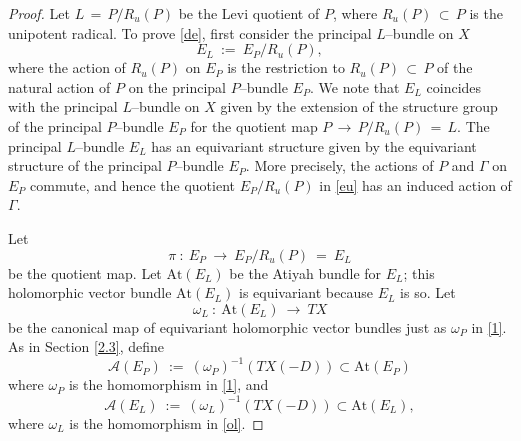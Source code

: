 \documentclass[12pt, reqno]{amsart}
\numberwithin{equation}{section}
\newcommand{\At}{\textrm{At}}
\begin{document}
\begin{proof}
Let $L\,=\, P/R_u(P)$ be the Levi quotient of $P$, where $R_u(P)\, \subset\, P$ is the
unipotent radical. To prove \eqref{de}, first consider the principal $L$--bundle on $X$
\begin{equation}\label{eu}
E_{L}\ :=\ E_P/R_u(P),
\end{equation}
where the action of $R_u(P)$ on $E_P$ is the restriction to $R_u(P)\, \subset\, P$ of the natural
action of $P$ on the principal $P$--bundle $E_P$. We note that $E_L$ coincides with the principal
$L$--bundle on $X$ given by the extension of the structure group of the principal $P$--bundle
$E_P$ for the quotient map
$P\, \longrightarrow\, P/R_u(P)\,=\, L$. The principal $L$--bundle $E_L$ has an equivariant structure
given by the equivariant structure of the principal $P$--bundle $E_P$. More precisely, the
actions of $P$ and $\Gamma$ on $E_P$ commute, and hence the quotient $E_P/R_u(P)$ in \eqref{eu} has
an induced action of $\Gamma$.

Let
\begin{equation}\label{dp}
\pi\ :\ E_{P}\ \longrightarrow\ E_P/R_u(P)\ =\ E_{L}
\end{equation}
be the quotient map. Let $\At(E_{L})$ be the Atiyah bundle for $E_{L}$;
this holomorphic vector bundle $\At(E_{L})$ is equivariant because $E_{L}$ is so. Let
\begin{equation}\label{ol}
\omega_L\ :\ \text{At}(E_L)\ \longrightarrow\ TX
\end{equation}
be the canonical map of equivariant holomorphic vector bundles just as $\omega_{P}$ in \eqref{1}.
As in Section \ref{2.3}, define
\begin{equation}\label{dp2a}
\mathcal{A}(E_P)\ :=\ (\omega_P)^{-1}(TX(-D))\subset\textrm{At}(E_P)
\end{equation}
where $\omega_P$ is the homomorphism in \eqref{1}, and
\begin{equation}\label{dp2b}
\mathcal{A}(E_L)\ :=\ (\omega_L)^{-1}(TX(-D))\subset\textrm{At}(E_L),
\end{equation}
where $\omega_L$ is the homomorphism in \eqref{ol}.


\end{proof}
\end{document}

